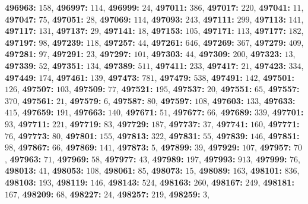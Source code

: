 \textsf{\bfseries 496963:} $158$, \textsf{\bfseries 496997:} $114$, \textsf{\bfseries 496999:} $24$, \textsf{\bfseries 497011:} $386$, \textsf{\bfseries 497017:} $220$, \textsf{\bfseries 497041:} $11$, \textsf{\bfseries 497047:} $75$, \textsf{\bfseries 497051:} $28$, \textsf{\bfseries 497069:} $114$, \textsf{\bfseries 497093:} $243$, \textsf{\bfseries 497111:} $299$, \textsf{\bfseries 497113:} $141$, \textsf{\bfseries 497117:} $131$, \textsf{\bfseries 497137:} $29$, \textsf{\bfseries 497141:} $18$, \textsf{\bfseries 497153:} $105$, \textsf{\bfseries 497171:} $113$, \textsf{\bfseries 497177:} $182$, \textsf{\bfseries 497197:} $98$, \textsf{\bfseries 497239:} $118$, \textsf{\bfseries 497257:} $44$, \textsf{\bfseries 497261:} $646$, \textsf{\bfseries 497269:} $367$, \textsf{\bfseries 497279:} $409$, \textsf{\bfseries 497281:} $97$, \textsf{\bfseries 497291:} $23$, \textsf{\bfseries 497297:} $101$, \textsf{\bfseries 497303:} $44$, \textsf{\bfseries 497309:} $200$, \textsf{\bfseries 497323:} $13$, \textsf{\bfseries 497339:} $52$, \textsf{\bfseries 497351:} $134$, \textsf{\bfseries 497389:} $511$, \textsf{\bfseries 497411:} $233$, \textsf{\bfseries 497417:} $21$, \textsf{\bfseries 497423:} $334$, \textsf{\bfseries 497449:} $174$, \textsf{\bfseries 497461:} $139$, \textsf{\bfseries 497473:} $781$, \textsf{\bfseries 497479:} $538$, \textsf{\bfseries 497491:} $142$, \textsf{\bfseries 497501:} $126$, \textsf{\bfseries 497507:} $103$, \textsf{\bfseries 497509:} $77$, \textsf{\bfseries 497521:} $195$, \textsf{\bfseries 497537:} $20$, \textsf{\bfseries 497551:} $65$, \textsf{\bfseries 497557:} $370$, \textsf{\bfseries 497561:} $21$, \textsf{\bfseries 497579:} $6$, \textsf{\bfseries 497587:} $80$, \textsf{\bfseries 497597:} $108$, \textsf{\bfseries 497603:} $133$, \textsf{\bfseries 497633:} $415$, \textsf{\bfseries 497659:} $191$, \textsf{\bfseries 497663:} $140$, \textsf{\bfseries 497671:} $51$, \textsf{\bfseries 497677:} $66$, \textsf{\bfseries 497689:} $339$, \textsf{\bfseries 497701:} $93$, \textsf{\bfseries 497711:} $221$, \textsf{\bfseries 497719:} $83$, \textsf{\bfseries 497729:} $187$, \textsf{\bfseries 497737:} $37$, \textsf{\bfseries 497741:} $160$, \textsf{\bfseries 497771:} $76$, \textsf{\bfseries 497773:} $80$, \textsf{\bfseries 497801:} $155$, \textsf{\bfseries 497813:} $322$, \textsf{\bfseries 497831:} $55$, \textsf{\bfseries 497839:} $146$, \textsf{\bfseries 497851:} $98$, \textsf{\bfseries 497867:} $66$, \textsf{\bfseries 497869:} $141$, \textsf{\bfseries 497873:} $5$, \textsf{\bfseries 497899:} $39$, \textsf{\bfseries 497929:} $107$, \textsf{\bfseries 497957:} $70$, \textsf{\bfseries 497963:} $71$, \textsf{\bfseries 497969:} $58$, \textsf{\bfseries 497977:} $43$, \textsf{\bfseries 497989:} $197$, \textsf{\bfseries 497993:} $913$, \textsf{\bfseries 497999:} $76$, \textsf{\bfseries 498013:} $41$, \textsf{\bfseries 498053:} $108$, \textsf{\bfseries 498061:} $85$, \textsf{\bfseries 498073:} $15$, \textsf{\bfseries 498089:} $163$, \textsf{\bfseries 498101:} $836$, \textsf{\bfseries 498103:} $193$, \textsf{\bfseries 498119:} $146$, \textsf{\bfseries 498143:} $524$, \textsf{\bfseries 498163:} $260$, \textsf{\bfseries 498167:} $249$, \textsf{\bfseries 498181:} $167$, \textsf{\bfseries 498209:} $68$, \textsf{\bfseries 498227:} $24$, \textsf{\bfseries 498257:} $219$, \textsf{\bfseries 498259:} $3$, 

